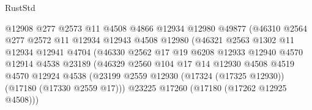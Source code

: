 \begin{lexlean}{RustStd}
\begin{coremodule}
{\begin{coremodule}
{{{{{{{{{{{{{{{{{{{{{{{{{{{{{{{{{{{{{{{{{{{{{{{{{{{{{{{                                    @12908
                                    @277
                                    @2573
                                    @11
                                    @4508
                                    @4866
                                    @12934
                                    @12980
                                    @49877
                                    (@46310
                                      @2564
                                      @277
                                      @2572
                                      @11
                                      @12934
                                      @12943
                                      @4508
                                      @12980
                                      (@46321
                                        @2563
                                        @1302
                                        @11
                                        @12934
                                        @12941
                                        @4704
                                        (@46330
                                          @2562
                                          @17
                                          @19
                                          @6208
                                          @12933
                                          @12940
                                          @4570
                                          @12914
                                          @4538
                                          @23189
                                          (@46329
                                            @2560
                                            @104
                                            @17
                                            @14
                                            @12930
                                            @4508
                                            @4519
                                            @4570
                                            @12924
                                            @4538
                                            (@23199
                                              @2559
                                              @12930
                                              (@17324 (@17325 @12930))
                                              (@17180 (@17330 @2559 @17)))
                                            @23225
                                            @17260
                                            (@17180 (@17262 @12925 @4508)))
}}}}}}}}}}}}}}}}}}}}}}}}}}}}}}}}}}}}}}}}}}}}}}}}}}}}}}}
\end{coremodule}}
\end{coremodule}
\end{lexlean}

